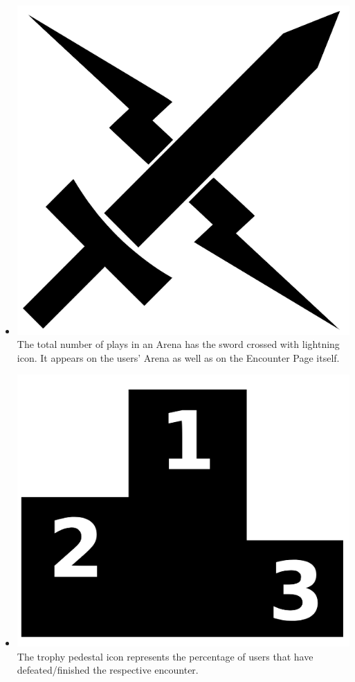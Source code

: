 \documentclass[12pt,a4paper]{report}
\begin{document}
\begin{itemize}
		\item \includegraphics[scale=.03]{sword_lightning}
		The total number of plays in an Arena has the sword crossed with lightning icon. It appears on the users' Arena as well as on the Encounter Page itself.
		\item \includegraphics[scale=.03]{win_rate}
		The trophy pedestal icon represents the percentage of users that have defeated/finished the respective encounter.

\end{itemize}
\end{document}
